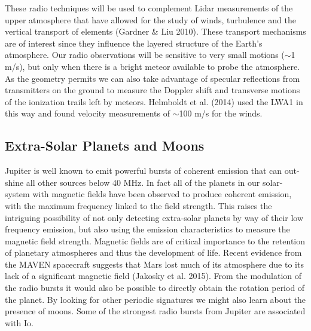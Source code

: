 \documentclass[11pt]{article}
\begin{document}
These radio techniques will be used to complement Lidar measurements
of the upper atmosphere that have allowed for the study of winds,
turbulence and the vertical transport of elements (Gardner \& Liu
2010).  These transport mechanisms are of interest since they
influence the layered structure of the Earth's atmosphere.  Our radio
observations will be sensitive to very small motions ($\sim$1 m/s),
but only when there is a bright meteor available to probe the
atmosphere.  As the geometry permits we can also take advantage of
specular reflections from transmitters on the ground to measure the
Doppler shift and transverse motions of the ionization trails left by
meteors.  Helmboldt et al. (2014) used the LWA1 in this way and found
velocity measurements of $\sim$100 m/s for the winds.

\vspace{-0.5cm}
\subsection{Extra-Solar Planets and Moons}
\vspace{-0.25cm}

Jupiter is well known to emit powerful bursts of coherent emission
that can out-shine all other sources below 40 MHz.  In fact all of the
planets in our solar-system with magnetic fields have been observed to
produce coherent emission, with the maximum frequency linked to the
field strength.  This raises the intriguing possibility of not only
detecting extra-solar planets by way of their low frequency emission,
but also using the emission characteristics to measure the magnetic
field strength.  Magnetic fields are of critical importance to the
retention of planetary atmospheres and thus the development of life.
Recent evidence from the MAVEN spacecraft suggests that Mars lost much
of its atmosphere due to its lack of a significant magnetic field
(Jakosky et al. 2015).  From the modulation of the radio bursts it
would also be possible to directly obtain the rotation period of the
planet.  By looking for other periodic signatures we might also 
learn about the presence of moons.  Some of the
strongest radio bursts from Jupiter are associated with Io.
\end{document}
